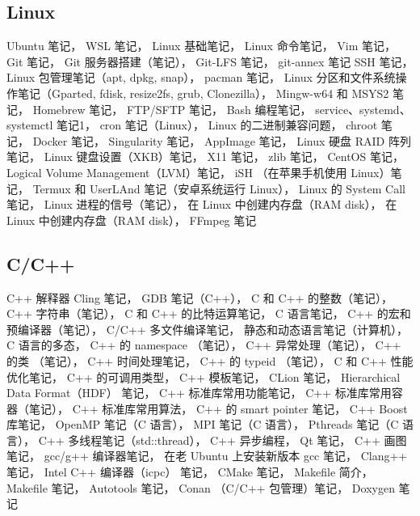\subsection{Linux}
Ubuntu 笔记，
WSL 笔记，
Linux 基础笔记，
Linux 命令笔记，
Vim 笔记，
Git 笔记，
Git 服务器搭建（笔记），
Git-LFS 笔记，
git-annex 笔记
SSH 笔记，
Linux 包管理笔记（apt, dpkg, snap），
pacman 笔记，
Linux 分区和文件系统操作笔记（Gparted, fdisk, resize2fs, grub, Clonezilla），
Mingw-w64 和 MSYS2 笔记，
Homebrew 笔记，
FTP/SFTP 笔记，
Bash 编程笔记，
service、systemd、systemctl 笔记1，
cron 笔记（Linux），
Linux 的二进制兼容问题，
chroot 笔记，
Docker 笔记，
Singularity 笔记，
AppImage 笔记，
Linux 硬盘 RAID 阵列笔记，
Linux 键盘设置（XKB）笔记，
X11 笔记，
zlib 笔记，
CentOS 笔记，
Logical Volume Management（LVM）笔记，
iSH （在苹果手机使用 Linux）笔记，
Termux 和 UserLAnd 笔记（安卓系统运行 Linux），
Linux 的 System Call 笔记，
Linux 进程的信号（笔记），
在 Linux 中创建内存盘（RAM disk），
在 Linux 中创建内存盘（RAM disk），
FFmpeg 笔记

\subsection{C/C++}
C++ 解释器 Cling 笔记，
GDB 笔记（C++），
C 和 C++ 的整数（笔记），
C++ 字符串（笔记），
C 和 C++ 的比特运算笔记，
C 语言笔记，
C++ 的宏和预编译器（笔记），
C/C++ 多文件编译笔记，
静态和动态语言笔记（计算机），
C 语言的多态，
C++ 的 namespace （笔记），
C++ 异常处理（笔记），
C++ 的类 （笔记），
C++ 时间处理笔记，
C++ 的 typeid （笔记），
C 和 C++ 性能优化笔记，
C++ 的可调用类型，
C++ 模板笔记，
CLion 笔记，
Hierarchical Data Format（HDF） 笔记，
C++ 标准库常用功能笔记，
C++ 标准库常用容器（笔记），
C++ 标准库常用算法，
C++ 的 smart pointer 笔记，
C++ Boost 库笔记，
OpenMP 笔记（C 语言），
MPI 笔记（C 语言），
Pthreads 笔记（C 语言），
C++ 多线程笔记（std::thread），
C++ 异步编程，
Qt 笔记，
C++ 画图笔记，
gcc/g++ 编译器笔记，
在老 Ubuntu 上安装新版本 gcc 笔记，
Clang++ 笔记，
Intel C++ 编译器（icpc） 笔记，
CMake 笔记，
Makefile 简介，
Makefile 笔记，
Autotools 笔记，
Conan （C/C++ 包管理）笔记，
Doxygen 笔记

